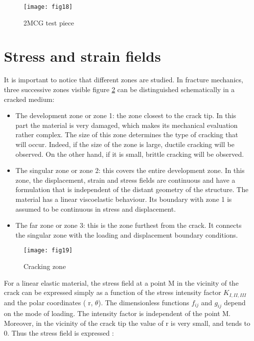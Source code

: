\graphicspath{{Images/}}
\begin{figure}[htp]
	\centering
	\texttt{[image: fig18]}
	\caption{2MCG test piece \cite{Reference8}}
	\label{fig:fig18}
\end{figure}

\section{Stress and strain fields}

It is important to notice that different zones are studied. In fracture mechanics, three successive zones visible figure \ref{fig:fig19} can be distinguished schematically in a cracked medium:

\begin{itemize}
	\item The development zone or zone 1: the zone closest to the crack tip. In this part the material is very damaged, which makes its mechanical evaluation rather complex. The size of this zone determines the type of cracking that will occur. Indeed, if the size of the zone is large, ductile cracking will be observed. On the other hand, if it is small, brittle cracking will be observed.
	\item The singular zone or zone 2: this covers the entire development zone. In this zone, the displacement, strain and stress fields are continuous and have a formulation that is independent of the distant geometry of the structure. The material has a linear viscoelastic behaviour. Its boundary with zone 1 is assumed to be continuous in stress and displacement.
	\item The far zone or zone 3: this is the zone furthest from the crack. It connects the singular zone with the loading and displacement boundary conditions.
\end{itemize}

\graphicspath{{Images/}}
\begin{figure}[htp]
	\centering
	\texttt{[image: fig19]}
	\caption{Cracking zone \cite{Reference8}}
	\label{fig:fig19}
\end{figure}

For a linear elastic material, the stress field at a point M in the vicinity of the crack can be expressed simply as a function of the stress intensity factor $K_{I,II,III}$ and the polar coordinates ( r, $\theta$). The dimensionless functions $f_{ij}$  and  $g_{ij}$ depend on the mode of loading. The intensity factor is independent of the point M. Moreover, in the vicinity of the crack tip the value of r is very small, and tends to 0. Thus the stress field is expressed :

